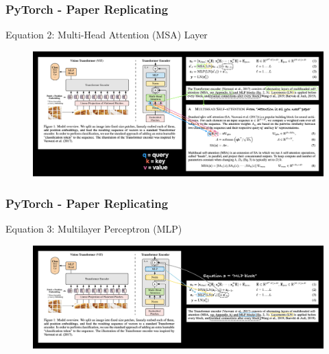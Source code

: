 \documentclass{beamer}
\begin{document}
\begin{frame}
	\frametitle{PyTorch - Paper Replicating}
	\begin{block}{Equation 2: Multi-Head Attention (MSA) Layer}
		
	\begin{figure}
		\centering
		\includegraphics[width=1\linewidth]{figures/msa1}
	\end{figure}
		
	\end{block}
\end{frame}
\begin{frame}
	\frametitle{PyTorch - Paper Replicating}
	\begin{block}{Equation 3: Multilayer Perceptron (MLP)}
		
	\begin{figure}
		\centering
		\includegraphics[width=1\linewidth]{figures/mlp}
	\end{figure}
		
	\end{block}
\end{frame}
\end{document}
